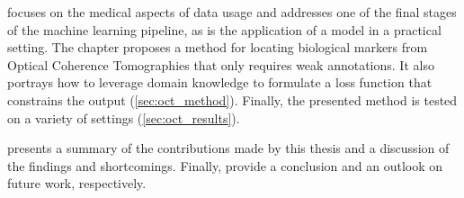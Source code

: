  focuses on the medical aspects of data usage and addresses one of the final stages of the machine learning pipeline, as is the application of a model in a practical setting. The chapter proposes a method for locating biological markers from Optical Coherence Tomographies that only requires weak annotations. It also portrays how to leverage domain knowledge to formulate a loss function that constrains the output (\cref{sec:oct_method}). Finally, the presented method is tested on a variety of settings (\cref{sec:oct_results}).

 presents a summary of the contributions made by this thesis and a discussion of the findings and shortcomings. Finally,  provide a conclusion and an outlook on future work, respectively.